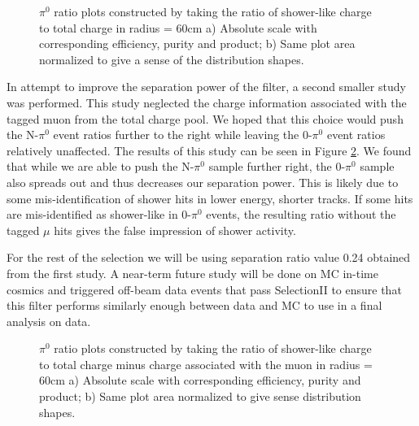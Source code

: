 \documentclass[a4paper]{article}
\begin{document}
\begin{figure}[h!]
\centering
{}
\hspace{1 mm}
\caption{$\pi^0$ ratio plots constructed by taking the ratio of shower-like charge to total charge in radius = 60cm a) Absolute scale with corresponding efficiency, purity and product; b) Same plot area normalized to give a sense of the distribution shapes. }
\label{fig:separation}
\end{figure}

In attempt to improve the separation power of the filter, a second smaller study was performed. This study neglected the charge information associated with the tagged muon from the total charge pool. We hoped that this choice would push the N-$\pi^0$ event ratios further to the right while leaving the 0-$\pi^0$ event ratios relatively unaffected.  The results of this study can be seen in Figure \ref{fig:separation_no_mu}.  We found that while we are able to push the N-$\pi^0$ sample further right, the 0-$\pi^0$ sample also spreads out and thus decreases our separation power. This is likely due to some mis-identification of shower hits in lower energy, shorter tracks.  If some hits are mis-identified as shower-like in 0-$\pi^0$ events, the resulting ratio without the tagged $\mu$ hits gives the false impression of shower activity. 
\par For the rest of the selection we will be using separation ratio value 0.24 obtained from the first study. A near-term future study will be done on MC in-time cosmics and triggered off-beam data events that pass SelectionII to ensure that this filter performs similarly enough between data and MC to use in a final analysis on data.

\begin{figure}[h!]
\centering
{}
\hspace{1 mm}
\caption{$\pi^0$ ratio plots constructed by taking the ratio of shower-like charge to total charge minus charge associated with the muon in radius = 60cm a) Absolute scale with corresponding efficiency, purity and product; b) Same plot area normalized to give sense distribution shapes. }
\label{fig:separation_no_mu}
\end{figure}
\end{document}
